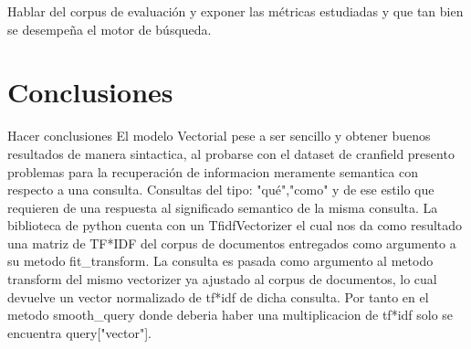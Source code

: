 \documentclass[runningheads]{llncs}
\begin{document}
Hablar del corpus de evaluación y exponer las métricas estudiadas y que tan bien se desempeña el
motor de búsqueda.

\section{Conclusiones}

Hacer conclusiones
El modelo Vectorial pese a ser sencillo y obtener buenos resultados de manera sintactica, al probarse con el dataset de cranfield
presento problemas para la recuperación de informacion meramente semantica con respecto a una consulta. Consultas del tipo: "qué","como" 
y de ese estilo que requieren de una respuesta al significado semantico de la misma consulta.
La biblioteca de python cuenta con un TfidfVectorizer el cual nos da como resultado una matriz de TF*IDF del corpus de documentos
entregados como argumento a su metodo fit_transform.
La consulta es pasada como argumento al metodo transform del mismo vectorizer ya ajustado al corpus de documentos, lo cual devuelve un
 vector normalizado de tf*idf de dicha consulta. Por tanto en el metodo smooth_query donde deberia haber una multiplicacion de tf*idf 
 solo se encuentra query["vector"]. 





\end{document}
